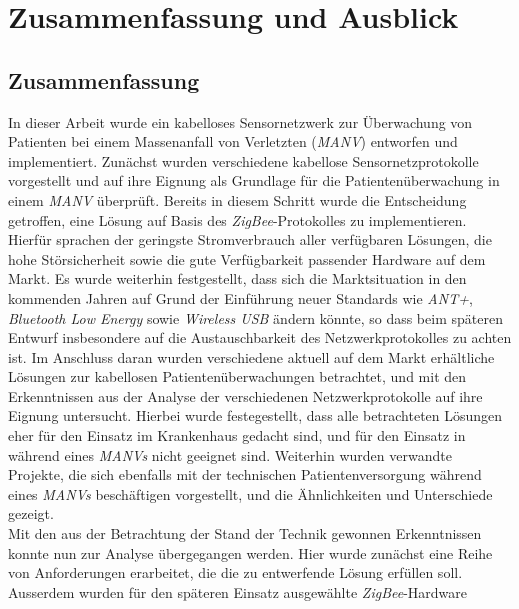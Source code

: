 
\chapter{Zusammenfassung und Ausblick}\label{Ausblick}

\section{Zusammenfassung}
In dieser Arbeit wurde ein kabelloses Sensornetzwerk zur Überwachung von Patienten bei einem 
Massenanfall von Verletzten (\emph{MANV}) entworfen und implementiert. Zunächst wurden 
verschiedene kabellose Sensornetzprotokolle vorgestellt und auf ihre Eignung als Grundlage für
die Patientenüberwachung in einem \emph{MANV} überprüft. Bereits in diesem Schritt wurde die Entscheidung
getroffen, eine Lösung auf Basis des \emph{ZigBee}-Protokolles zu implementieren. Hierfür sprachen
der geringste Stromverbrauch aller verfügbaren Lösungen, die hohe Störsicherheit sowie die
gute Verfügbarkeit passender Hardware auf dem Markt. Es wurde weiterhin festgestellt, dass sich die
Marktsituation in den kommenden Jahren auf Grund der Einführung neuer Standards wie \emph{ANT+},
\emph{Bluetooth Low Energy} sowie \emph{Wireless USB} ändern könnte, so dass beim späteren Entwurf
insbesondere auf die Austauschbarkeit des Netzwerkprotokolles zu achten ist. Im Anschluss daran wurden
verschiedene aktuell auf dem Markt erhältliche Lösungen zur kabellosen Patientenüberwachungen betrachtet, 
und mit den Erkenntnissen aus der Analyse der verschiedenen Netzwerkprotokolle auf ihre Eignung untersucht.
Hierbei wurde festegestellt, dass alle betrachteten Lösungen eher für den Einsatz im Krankenhaus
gedacht sind, und für den Einsatz in während eines \emph{MANVs} nicht geeignet sind. Weiterhin wurden verwandte
Projekte, die sich ebenfalls mit der technischen Patientenversorgung während eines \emph{MANVs} beschäftigen
vorgestellt, und die Ähnlichkeiten und Unterschiede gezeigt.\\
Mit den aus der Betrachtung der Stand der Technik gewonnen Erkenntnissen konnte nun zur Analyse 
übergegangen werden. Hier wurde zunächst eine Reihe von Anforderungen erarbeitet, die die zu entwerfende 
Lösung erfüllen soll. Ausserdem wurden für den späteren Einsatz ausgewählte \emph{ZigBee}-Hardware 
